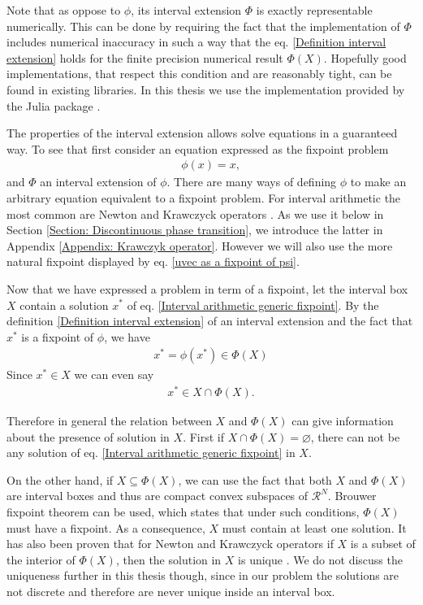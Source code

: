 \documentclass[
11pt, %
english, %
singlespacing, %
nolistspacing, %
liststotoc, %
headsepline, %
]{MastersDoctoralThesis} %
\begin{document}
Note that as oppose to $\phi$, its interval extension $\Phi$ is exactly representable numerically. This can be done by requiring the fact that the implementation of $\Phi$ includes numerical inaccuracy in such a way that the eq. \eqref{Definition interval extension} holds for the finite precision numerical result $\Phi(X)$. Hopefully good implementations, that respect this condition and are reasonably tight, can be found in existing libraries. In this thesis we use the implementation provided by the Julia package \missingref{}.

The properties of the interval extension allows solve equations in a guaranteed way. To see that first consider an equation expressed as the fixpoint problem
\begin{align}
	\phi(x) = x,  \label{Interval arithmetic generic fixpoint}
\end{align}
and $\Phi$ an interval extension of $\phi$. There are many ways of defining $\phi$ to make an arbitrary equation equivalent to a fixpoint problem. For interval arithmetic the most common are Newton and Krawczyck  operators \cite{moore2009introduction, tucker2011validated}. As we use it below in Section \ref{Section: Discontinuous phase transition}, we introduce the latter in Appendix \ref{Appendix: Krawczyk operator}. However we will also use the more natural fixpoint displayed by eq. \eqref{uvec as a fixpoint of psi}.

Now that we have expressed a problem in term of a fixpoint, let the interval box $X$ contain a solution $x^*$ of eq. \eqref{Interval arithmetic generic fixpoint}. By the definition \ref{Definition interval extension} of an interval extension and the fact that $x^*$ is a fixpoint of $\phi$, we have
\begin{align}
	x^* = \phi(x^*) \in \Phi(X)
\end{align}
Since $x^* \in X$ we can even say
\begin{align}
	x^* \in X \cap \Phi(X).  \label{Generic solution refinement}
\end{align}

Therefore in general the relation between $X$ and $\Phi(X)$ can give information about the presence of solution in $X$. First if $X \cap \Phi(X) = \varnothing$, there can not be any solution of eq. \eqref{Interval arithmetic generic fixpoint} in $X$.

On the other hand, if $X \subseteq \Phi(X)$, we can use the fact that both $X$ and $\Phi(X)$ are interval boxes and thus are compact convex subspaces of $\mathcal{R}^N$. Brouwer fixpoint theorem can be used, which states that under such conditions, $\Phi(X)$ must have a fixpoint. As a consequence, $X$ must contain at least one solution. It has also been proven that for Newton and Krawczyck operators if $X$ is a subset of the interior of $\Phi(X)$, then the solution in $X$ is unique \cite{moore2009introduction, tucker2011validated}. We do not discuss the uniqueness further in this thesis though, since in our problem the solutions are not discrete and therefore are never unique inside an interval box.
\end{document}
